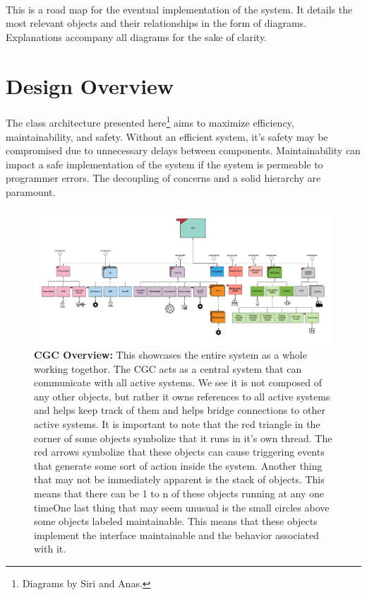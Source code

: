 \documentclass[12pt]{article}
\begin{document}
\paragraph{} This is a road map for the eventual implementation of the system. It details the most 
relevant objects and their relationships in the form of diagrams. Explanations accompany all diagrams 
for the sake of clarity.

\section{Design Overview} \label{over}
\paragraph{} The class architecture presented here\footnote{Diagrams by 
Siri and Anas.} aims to maximize efficiency, maintainability, and 
safety. Without an efficient system, it's safety may be compromised due to unnecessary 
delays between components. Maintainability can impact a safe implementation of the 
system if the system is permeable to programmer errors. The decoupling of concerns and 
a solid hierarchy are paramount. 


\begin{figure}[H]
    \centerline{\includegraphics[scale=.095]{CGCOverview.png}}
    \caption{\textbf{CGC Overview:} This showcases the entire system as a whole working togethor. The CGC 
acts as a central system that can communicate with all active systems. We see it is not composed 
of any other objects, but rather it owns references to all active systems and helps keep track of 
them and helps bridge connections to other active systems. It is important to note that the red 
triangle in the corner of some objects symbolize that it runs in it's own thread. The red arrows 
symbolize that these objects can cause triggering events that generate some sort of action inside the 
system. Another thing that may not be immediately apparent is the stack of objects. This means that there 
can be 1 to n of these objects running at any one timeOne last thing that may seem unusual is the 
small circles above some objects labeled maintainable. This means that these objects implement 
the interface maintainable and the behavior 
associated with it.}
  \label{fig:CGCOverview}
\end{figure}    
\end{document}
